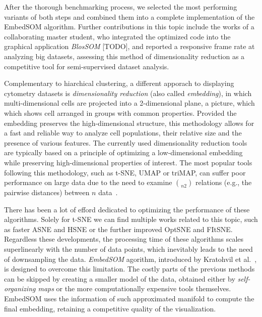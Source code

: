 After the thorough benchmarking process, we selected the most performing variants of both steps and combined them into a complete implementation of the EmbedSOM algorithm. Further contributions in this topic include the works of a collaborating master student, who integrated the optimized code into the graphical application \emph{BlosSOM} [TODO], and reported a responsive frame rate at analyzing big datasets, assessing this method of dimensionality reduction as a competitive tool for semi-supervised dataset analysis.

Complementary to hiarchical clustering, a different apporach to displaying cytometry datasets is \emph{dimensionality reduction} (also called \emph{embedding}), in which multi-dimensional cells are projected into a 2-dimensional plane, a picture, which which shows cell arranged in groups with common properties. Provided the embedding preserves the high-dimensional structure, this methodology allows for a fast and reliable way to analyze cell populations, their relative size and the presence of various features. The currently used dimensionality reduction tools are typically based on a principle of optimizing a low-dimensional embedding while preserving high-dimensional properties of interest. The most popular tools following this methodology, such as t-SNE, UMAP or triMAP, can suffer poor performance on large data due to the need to examine $\choose{n}{2}$ relations (e.g., the pairwise distances) between $n$ data~\cite{kratochvil2019generalized}.

There has been a lot of efford dedicated to optimizing the performance of these algorithms. Solely for t-SNE we can find multiple works related to this topic, such as faster ASNE and HSNE or the further improved OptSNE and FItSNE. Regardless these developments, the processing time of these algorithms scales superlinearly with the number of data points, which inevitably leads to the need of downsampling the data. \emph{EmbedSOM} agorithm, introduced by Kratohvil et al.~\cite{kratochvil2019generalized}, is designed to overcome this limitation. The costly parts of the previous methods can be skipped by creating a smaller model of the data, obtained either by \emph{self-organizing maps} or the more computationally expensive tools themselves. EmbedSOM uses the information of such approximated manifold to compute the final embedding, retaining a competitive quality of the visualization. 







